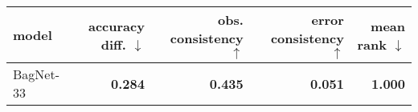 \begin{tabular}{lrrrr}
\toprule
    model & accuracy diff. $\downarrow$ & obs. consistency $\uparrow$ & error consistency $\uparrow$ & mean rank $\downarrow$ \\
\midrule
BagNet-33 &              \textbf{0.284} &              \textbf{0.435} &               \textbf{0.051} &         \textbf{1.000} \\
\bottomrule
\end{tabular}

